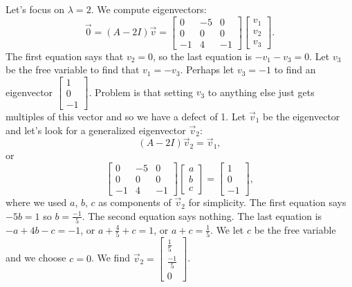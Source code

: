 \documentclass{ximera}
\begin{document}
\begin{exampleSol}
    Let's focus on $\lambda = 2$.  We compute eigenvectors:
    \begin{equation*}
        \vec{0} = (A - 2 I) \vec{v}=
        \begin{bmatrix}
            0 & -5 & 0 \\
            0 & 0 & 0 \\
            -1 & 4 & -1
        \end{bmatrix}
        \begin{bmatrix}
            v_1 \\ 
            v_2 \\
            v_3
        \end{bmatrix}.
    \end{equation*}
    The first equation says that $v_2 = 0$, so the last equation is $-v_1 -v_3 = 0$.  Let $v_3$ be the free variable to find that $v_1 = -v_3$.  Perhaps let $v_3 = -1$ to find an eigenvector $\left[ \begin{smallmatrix} 1 \\ 0 \\ -1 \end{smallmatrix} \right]$. Problem is that setting $v_3$ to anything else just gets multiples of this vector and so we have a defect of 1. Let $\vec{v}_1$ be the eigenvector and let's look for a generalized eigenvector $\vec{v}_2$:
    \begin{equation*}
        (A - 2 I) \vec{v}_2 = \vec{v}_1 , 
    \end{equation*}
    or
    \begin{equation*}
        \begin{bmatrix}
            0 & -5 & 0 \\
            0 & 0 & 0 \\
            -1 & 4 & -1
        \end{bmatrix}
        \begin{bmatrix}
            a \\ 
            b \\ 
            c
        \end{bmatrix}
        =
        \begin{bmatrix}
            1 \\ 
            0 \\ 
            -1
        \end{bmatrix} ,
    \end{equation*}
    where we used $a$, $b$, $c$ as components of $\vec{v}_2$ for simplicity. The first equation says $-5b = 1$ so $b = \frac{-1}{5}$.  The second equation says nothing. The last equation is $-a + 4b - c = -1$, or $a + \frac{4}{5} + c = 1$, or $a + c = \frac{1}{5}$.  We let $c$ be the free variable and we choose $c=0$.  We find $\vec{v}_2 = \left[ \begin{smallmatrix} \frac{1}{5} \\ \frac{-1}{5} \\ 0 \end{smallmatrix} \right]$.
    

\end{exampleSol}
\end{document}
